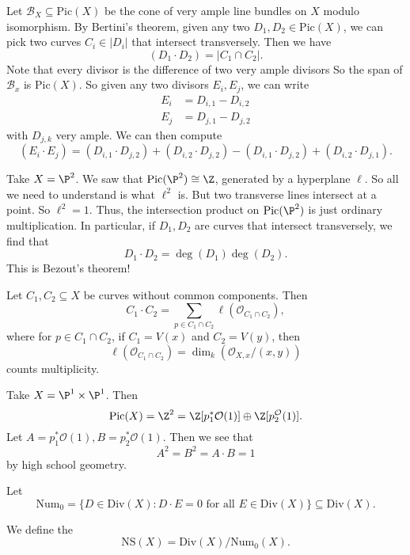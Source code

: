\documentclass[a4paper]{article}
\newcommand\Div{\mathrm{Div}}
\newcommand\Pic{\mathrm{Pic}}
\newcommand\Num{\mathrm{Num}}
\newcommand\NS{\mathrm{NS}}
\begin{document}
Let $\mathcal{B}_X \subseteq \Pic(X)$ be the cone of very ample line bundles on $X$ modulo isomorphism. By Bertini's theorem, given any two $D_1, D_2 \in \Pic(X)$, we can pick two curves $C_i \in |D_i|$ that intersect transversely. Then we have
\[
  (D_1 \cdot D_2) = |C_1 \cap C_2|.
\]
Note that every divisor is the difference of two very ample divisors So the span of $\mathcal{B}_x$ is $\Pic(X)$. So given any two divisors $E_i, E_j$, we can write
\begin{align*}
  E_i &= D_{i, 1} - D_{i, 2}\\
  E_j &= D_{j, 1} - D_{j, 2}
\end{align*}
with $D_{j, k}$ very ample. We can then compute
\[
  (E_i \cdot E_j) = (D_{i, 1} \cdot D_{j, 2}) + (D_{i, 2} \cdot D_{j, 2}) - (D_{i, 1} \cdot D_{j, 2}) + (D_{i, 2}\cdot D_{j, 1}).
\]
\begin{eg}
  Take $X = \P^2$. We saw that $\Pic(\P^2) \cong \Z$, generated by a hyperplane $\ell$. So all we need to understand is what $\ell^2$ is. But two transverse lines intersect at a point. So $\ell^2 = 1$. Thus, the intersection product on $\Pic(\P^2)$ is just ordinary multiplication. In particular, if $D_1, D_2$ are curves that intersect transversely, we find that
  \[
    D_1 \cdot D_2 = \deg(D_1) \deg(D_2).
  \]
  This is Bezout's theorem!
\end{eg}
\begin{ex}
  Let $C_1, C_2 \subseteq X$ be curves without common components. Then
  \[
    C_1 \cdot C_2 = \sum_{p \in C_1 \cap C_2} \ell(\mathcal{O}_{C_1 \cap C_2}),
  \]
  where for $p \in C_1 \cap C_2$, if $C_1 = V(x)$ and $C_2 = V(y)$, then
  \[
    \ell(\mathcal{O}_{C_1 \cap C_2}) = \dim_k(\mathcal{O}_{X, x}/(x, y))
  \]
  counts multiplicity.
\end{ex}

\begin{eg}
  Take $X = \P^1 \times \P^1$. Then
  \[
    \Pic(X) = \Z^2 = \Z[p_1^* \mathcal{O}(1)] \oplus \Z[p_2^ \mathcal{O}(1)].
  \]
  Let $A = p_1^* \mathcal{O}(1), B = p_2^* \mathcal{O}(1)$. Then we see that
  \[
    A^2 = B^2 = A \cdot B = 1
  \]
  by high school geometry.
\end{eg}

\begin{defi}[$\Num_0$]\index{$\Num_0$}
  Let
  \[
    \Num_0 = \{D \in \Div(X) : D \cdot E = 0\text{ for all }E \in \Div(X)\} \subseteq \Div(X).
  \]
\end{defi}
\begin{defi}
  We define the 
  \[
    \NS(X) = \Div(X)/\Num_0(X).
  \]
\end{defi}
\end{document}
